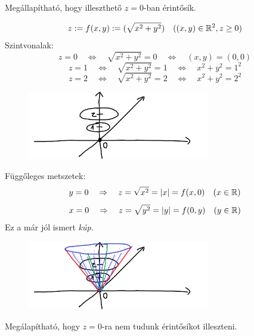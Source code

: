 \documentclass[a4paper,11.5pt]{article}
\begin{document}
	\begin{note}
		Megállapítható, hogy illeszthető $z=0$-ban érintősík.
	\end{note}
	\begin{task}
		\[ z:=f(x,y):=(\sqrt{x^2+y^2})\quad ((x,y)\in\mathbb{R}^2, z\geq 0) \]
		Szintvonalak:
		\[ z=0\quad \Leftrightarrow\quad \sqrt{x^2+y^2}=0\quad \Leftrightarrow\quad (x,y)=(0,0) \]
		\[ z=1\quad \Leftrightarrow\quad \sqrt{x^2+y^2}=1\quad \Leftrightarrow\quad x^2+y^2=1^2 \]
		\[ z=2\quad \Leftrightarrow\quad \sqrt{x^2+y^2}=2\quad \Leftrightarrow\quad x^2+y^2=2^2 \]
		\begin{figure}[H]
			\centering
			\includegraphics[height=3cm]{kepek/20.png}
			\caption{}
		\end{figure}
		Függőleges metszetek:
		\[ y=0\quad \Rightarrow\quad z=\sqrt{x^2}=|x|=f(x,0)\quad (x\in\mathbb{R}) \]
		\[ x=0\quad \Rightarrow\quad z=\sqrt{y^2}=|y|=f(0,y)\quad (y\in\mathbb{R}) \]
		Ez a már jól ismert \textit{kúp}.
		\begin{figure}[H]
			\centering
			\includegraphics[height=3cm]{kepek/21.png}
			\caption{}
		\end{figure}
	\end{task}
	\begin{note}
		Megálapítható, hogy $z=0$-ra nem tudunk érintősíkot illeszteni.
	\end{note}
\end{document}
